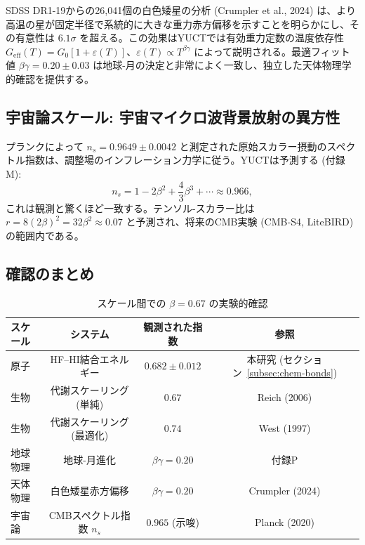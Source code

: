 \documentclass[11pt,a4paper]{article}
\begin{document}
	SDSS DR1-19からの26,041個の白色矮星の分析 (Crumpler et al., 2024) は、より高温の星が固定半径で系統的に大きな重力赤方偏移を示すことを明らかにし、その有意性は $6.1\sigma$ を超える。この効果はYUCTでは有効重力定数の温度依存性 $G_{\mathrm{eff}}(T) = G_0[1 + \varepsilon(T)]$、$\varepsilon(T) \propto T^{\beta\gamma}$ によって説明される。最適フィット値 $\beta\gamma = 0.20 \pm 0.03$ は地球-月の決定と非常によく一致し、独立した天体物理学的確認を提供する。
	
	\subsection{宇宙論スケール: 宇宙マイクロ波背景放射の異方性}
	\label{subsec:cmb}
	
	プランクによって $n_s = 0.9649 \pm 0.0042$ と測定された原始スカラー摂動のスペクトル指数は、調整場のインフレーション力学に従う。YUCTは予測する (付録M):
	\[
	n_s = 1 - 2\beta^2 + \frac{4}{3}\beta^3 + \cdots \approx 0.966,
	\]
	これは観測と驚くほど一致する。テンソル-スカラー比は $r = 8(2\beta)^2 = 32\beta^2 \approx 0.07$ と予測され、将来のCMB実験 (CMB‑S4, LiteBIRD) の範囲内である。
	
	\subsection{確認のまとめ}
	
	\begin{table}[h]
		\centering
		\caption{スケール間での $\beta = 0.67$ の実験的確認}
		\label{tab:confirmations}
	
			\begin{tabular}{lccc}
				\toprule
				スケール & システム & 観測された指数 & 参照 \\
				\midrule
				原子 & HF–HI結合エネルギー & $0.682 \pm 0.012$ & 本研究 (セクション~\ref{subsec:chem-bonds}) \\
				生物 & 代謝スケーリング (単純) & $0.67$ & Reich (2006) \\
				生物 & 代謝スケーリング (最適化) & $0.74$ & West (1997) \\
				地球物理 & 地球-月進化 & $\beta\gamma = 0.20$ & 付録P \\
				天体物理 & 白色矮星赤方偏移 & $\beta\gamma = 0.20$ & Crumpler (2024) \\
				宇宙論 & CMBスペクトル指数 $n_s$ & $0.965$ (示唆) & Planck (2020) \\
				\bottomrule
			\end{tabular}
	
	\end{table}
	
\end{document}
